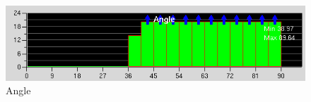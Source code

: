 \begin{figure}[H]
\begin{center}
\includegraphics[width=\textwidth]{chapter1_introduction/pictures/icem/castest_fluid_solid/angle.PNG}
\caption{Angle}
\end{center}
\end{figure}
